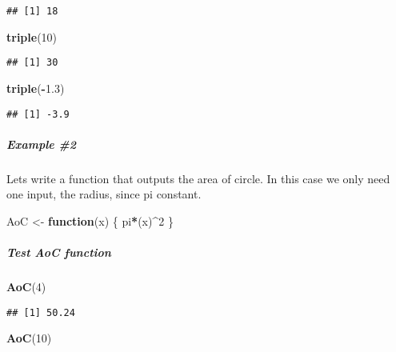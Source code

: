 \documentclass[]{article}
\newenvironment{Shaded}{\begin{snugshade}}{\end{snugshade}}
\newcommand{\KeywordTok}[1]{\textcolor[rgb]{0.13,0.29,0.53}{\textbf{#1}}}
\newcommand{\DecValTok}[1]{\textcolor[rgb]{0.00,0.00,0.81}{#1}}
\newcommand{\FloatTok}[1]{\textcolor[rgb]{0.00,0.00,0.81}{#1}}
\newcommand{\StringTok}[1]{\textcolor[rgb]{0.31,0.60,0.02}{#1}}
\newcommand{\ControlFlowTok}[1]{\textcolor[rgb]{0.13,0.29,0.53}{\textbf{#1}}}
\newcommand{\OperatorTok}[1]{\textcolor[rgb]{0.81,0.36,0.00}{\textbf{#1}}}
\newcommand{\NormalTok}[1]{#1}
\let\oldsubparagraph\subparagraph
\renewcommand{\subparagraph}[1]{\oldsubparagraph{#1}\mbox{}}
\begin{document}
\begin{verbatim}
## [1] 18
\end{verbatim}

\begin{Shaded}
\begin{Highlighting}[]
\KeywordTok{triple}\NormalTok{(}\DecValTok{10}\NormalTok{)}
\end{Highlighting}
\end{Shaded}

\begin{verbatim}
## [1] 30
\end{verbatim}

\begin{Shaded}
\begin{Highlighting}[]
\KeywordTok{triple}\NormalTok{(}\OperatorTok{-}\FloatTok{1.3}\NormalTok{)}
\end{Highlighting}
\end{Shaded}

\begin{verbatim}
## [1] -3.9
\end{verbatim}

\subparagraph{Example \#2}\label{example-2}

Lets write a function that outputs the area of circle. In this case we
only need one input, the radius, since pi constant.

\begin{Shaded}
\begin{Highlighting}[]
\NormalTok{AoC <-}\StringTok{ }\ControlFlowTok{function}\NormalTok{(x) \{}
\NormalTok{  pi}\OperatorTok{*}\NormalTok{(x)}\OperatorTok{^}\DecValTok{2}
\NormalTok{\}}
\end{Highlighting}
\end{Shaded}

\subparagraph{Test AoC function}\label{test-aoc-function}

\begin{Shaded}
\begin{Highlighting}[]
\KeywordTok{AoC}\NormalTok{(}\DecValTok{4}\NormalTok{)}
\end{Highlighting}
\end{Shaded}

\begin{verbatim}
## [1] 50.24
\end{verbatim}

\begin{Shaded}
\begin{Highlighting}[]
\KeywordTok{AoC}\NormalTok{(}\DecValTok{10}\NormalTok{)}
\end{Highlighting}
\end{Shaded}
\end{document}

